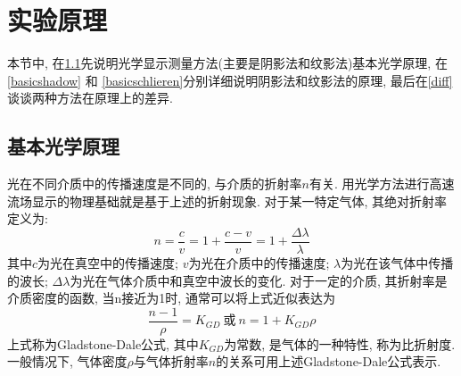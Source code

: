 \documentclass[12pt,a4paper,boxed,titlepage]{caspset}
\begin{document}
\section{实验原理}
本节中, 在\ref{basic}先说明光学显示测量方法(主要是阴影法和纹影法)基本光学原理, 在 \ref{basicshadow} 和 \ref{basicschlieren}分别详细说明阴影法和纹影法的原理, 最后在\ref{diff}谈谈两种方法在原理上的差异.

\subsection{基本光学原理}\label{basic}
光在不同介质中的传播速度是不同的, 与介质的折射率$n$有关. 用光学方法进行高速流场显示的物理基础就是基于上述的折射现象. 对于某一特定气体, 其绝对折射率定义为:
\[
n = \frac{c}{v} = 1 + \frac{c-v}{v} = 1 + \frac{\Delta\lambda}{\lambda}
\]
其中$c$为光在真空中的传播速度; $v$为光在介质中的传播速度; $\lambda$为光在该气体中传播的波长;  $\Delta\lambda$为光在气体介质中和真空中波长的变化. 对于一定的介质, 其折射率是介质密度的函数, 当n接近为1时, 通常可以将上式近似表达为
\[
\frac{n-1}{\rho} = K_{GD} {~}\textrm{或}{~} n=1+K_{GD}\rho
\]
上式称为Gladstone-Dale公式, 其中$K_{GD}$为常数, 是气体的一种特性, 称为比折射度. 一般情况下, 气体密度$\rho$与气体折射率$n$的关系可用上述Gladstone-Dale公式表示.
\end{document}
